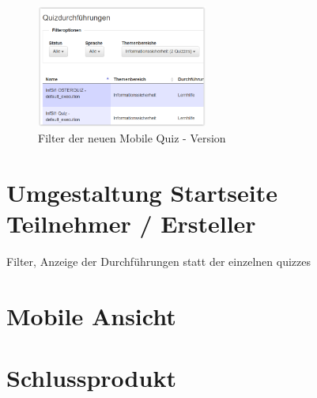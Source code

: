 \begin{figure}[H]
	\centering
	\includegraphics[width=0.5\textwidth]{Images/Neue_Filter_Mobile_Quiz.PNG}
	\caption{Filter der neuen Mobile Quiz - Version}
\end{figure}



\section{Umgestaltung Startseite Teilnehmer / Ersteller}
Filter, Anzeige der Durchführungen statt der einzelnen quizzes



\section{Mobile Ansicht}

\section{Schlussprodukt}


